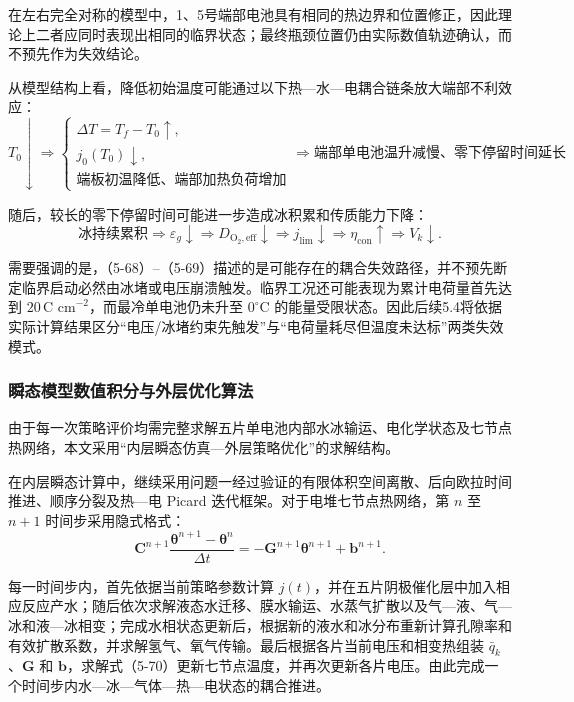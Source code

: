 \documentclass[bwprint]{gmcmthesis}
\numberwithin{figure}{section}
\begin{document}
\noindent 在左右完全对称的模型中，1、5号端部电池具有相同的热边界和位置修正，因此理论上二者应同时表现出相同的临界状态；最终瓶颈位置仍由实际数值轨迹确认，而不预先作为失效结论。

\noindent 从模型结构上看，降低初始温度可能通过以下热—水—电耦合链条放大端部不利效应：
\begin{equation}
T_0 \downarrow \Rightarrow \begin{cases} \Delta T = T_f - T_0 \uparrow, \\ j_0(T_0) \downarrow, \\ \text{端板初温降低、端部加热负荷增加} \end{cases} \Rightarrow \text{端部单电池温升减慢、零下停留时间延长} \tag{5-68}
\end{equation}

\noindent 随后，较长的零下停留时间可能进一步造成冰积累和传质能力下降：
\begin{equation}
\text{冰持续累积} \Rightarrow \varepsilon_g \downarrow \Rightarrow D_{\text{O}_2,\text{eff}} \downarrow \Rightarrow j_{\text{lim}} \downarrow \Rightarrow \eta_{\text{con}} \uparrow \Rightarrow V_k \downarrow. \tag{5-69}
\end{equation}

\noindent 需要强调的是，（5-68）--（5-69）描述的是可能存在的耦合失效路径，并不预先断定临界启动必然由冰堵或电压崩溃触发。临界工况还可能表现为累计电荷量首先达到 \(20 \, \text{C cm}^{-2}\)，而最冷单电池仍未升至 \(0^\circ\text{C}\) 的能量受限状态。因此后续5.4将依据实际计算结果区分“电压/冰堵约束先触发”与“电荷量耗尽但温度未达标”两类失效模式。

\subsubsection{瞬态模型数值积分与外层优化算法}

\noindent 由于每一次策略评价均需完整求解五片单电池内部水冰输运、电化学状态及七节点热网络，本文采用“内层瞬态仿真—外层策略优化”的求解结构。

\noindent 在内层瞬态计算中，继续采用问题一经过验证的有限体积空间离散、后向欧拉时间推进、顺序分裂及热—电 Picard 迭代框架。对于电堆七节点热网络，第 \(n\) 至 \(n+1\) 时间步采用隐式格式：
\begin{equation}
\mathbf{C}^{n+1} \frac{\boldsymbol{\theta}^{n+1} - \boldsymbol{\theta}^n}{\Delta t} = -\mathbf{G}^{n+1} \boldsymbol{\theta}^{n+1} + \mathbf{b}^{n+1}. \tag{5-70}
\end{equation}

\noindent 每一时间步内，首先依据当前策略参数计算 \(j(t)\)，并在五片阴极催化层中加入相应反应产水；随后依次求解液态水迁移、膜水输运、水蒸气扩散以及气—液、气—冰和液—冰相变；完成水相状态更新后，根据新的液水和冰分布重新计算孔隙率和有效扩散系数，并求解氢气、氧气传输。最后根据各片当前电压和相变热组装 \(\bar{q}_k\)、\(\mathbf{G}\) 和 \(\mathbf{b}\)，求解式（5-70）更新七节点温度，并再次更新各片电压。由此完成一个时间步内水—冰—气体—热—电状态的耦合推进。
\end{document}
